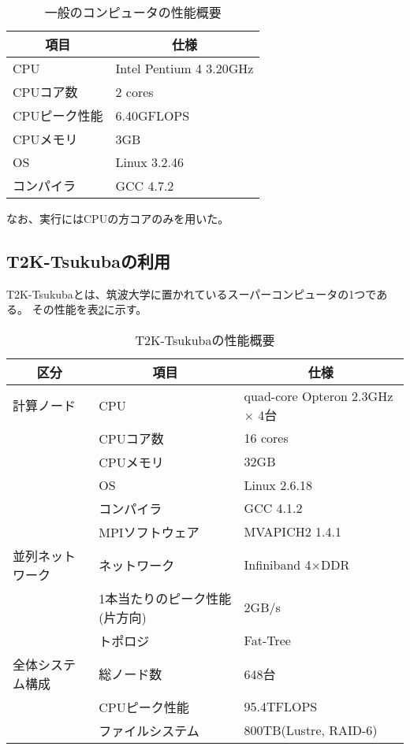 \begin{table}[htb]
	\begin{center}
	\begin{tabular}{|l|l|}
\hline \hline
\multicolumn{1}{|c|}{項目} & \multicolumn{1}{|c|}{仕様} \\
\hline \hline
CPU & Intel Pentium 4 3.20GHz \\
CPUコア数 & 2 cores \\
CPUピーク性能 & 6.40GFLOPS \\
CPUメモリ & 3GB \\
OS & Linux 3.2.46 \\
コンパイラ & GCC 4.7.2 \\
\hline
	\end{tabular}
	\end{center}
	\caption{一般のコンピュータの性能概要}
	\label{tb:normalpc-perf}
\end{table}

なお、実行にはCPUの方コアのみを用いた。


\subsection{T2K-Tsukubaの利用}
T2K-Tsukubaとは、筑波大学に置かれているスーパーコンピュータの1つである。
その性能を表\ref{tb:t2k-perf}に示す。

\begin{table}[htb]
	\begin{center}
	\begin{tabular}{|l|l|l|}
\hline \hline
\multicolumn{1}{|c|}{区分} & \multicolumn{1}{|c|}{項目} & \multicolumn{1}{|c|}{仕様} \\
\hline \hline
計算ノード & CPU & quad-core Opteron 2.3GHz $\times$ 4台 \\
& CPUコア数 & 16 cores \\
& CPUメモリ & 32GB \\
& OS & Linux 2.6.18 \\
& コンパイラ & GCC 4.1.2 \\
& MPIソフトウェア & MVAPICH2 1.4.1 \\
\hline
並列ネットワーク & ネットワーク & Infiniband 4$\times$DDR \\
& 1本当たりのピーク性能(片方向) & 2GB/s \\
& トポロジ & Fat-Tree \\\hline
全体システム構成 & 総ノード数 & 648台 \\
& CPUピーク性能 & 95.4TFLOPS \\
& ファイルシステム & 800TB(Lustre, RAID-6) \\\hline
	\end{tabular}
	\end{center}
 	\caption{T2K-Tsukubaの性能概要}
	\label{tb:t2k-perf}
\end{table}

